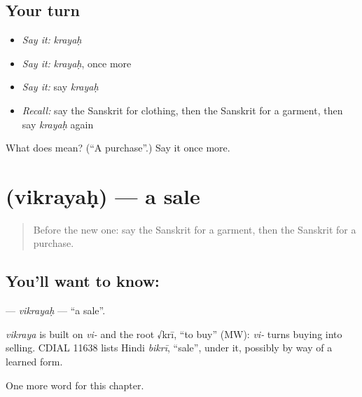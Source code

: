 \subsection*{Your turn}
\begin{itemize}
\raggedright
  \item \emph{Say it:} \emph{krayaḥ}
  \item \emph{Say it:} \emph{krayaḥ}, once more
  \item \emph{Say it:} say \emph{krayaḥ}
  \item \emph{Recall:} say the Sanskrit for clothing, then the Sanskrit for a garment, then say \emph{krayaḥ} again
\end{itemize}

\begin{tcolorbox}[breakable,colback=teal!4,colframe=teal!35!black,title={Before you move on}]
What does  mean? (\textquotedblleft{}A purchase\textquotedblright{}.) Say it once more.
\end{tcolorbox}
\section[\texorpdfstring{\sk{विक्रयः} (vikrayaḥ)}{विक्रयः (vikrayaḥ)}]{ (vikrayaḥ) — a sale}

\label{lesson:SA-C193-vikrayah}



\begin{quote}
Before the new one: say the Sanskrit for a garment, then the Sanskrit for a purchase.
\end{quote}

\subsection*{You'll want to know: }
\textbf{} — \emph{vikrayaḥ} — \textquotedblleft{}a sale\textquotedblright{}.

\begin{cousinweb}
\emph{vikraya} is built on \emph{vi-} and the root √krī, \textquotedblleft{}to buy\textquotedblright{} (MW): \emph{vi-} turns buying into selling. CDIAL 11638 lists Hindi \emph{bikrī}, \textquotedblleft{}sale\textquotedblright{}, under it, possibly by way of a learned form.
\end{cousinweb}

\begin{grammarlens}[title={What you've built}]
One more word for this chapter.
\end{grammarlens}

